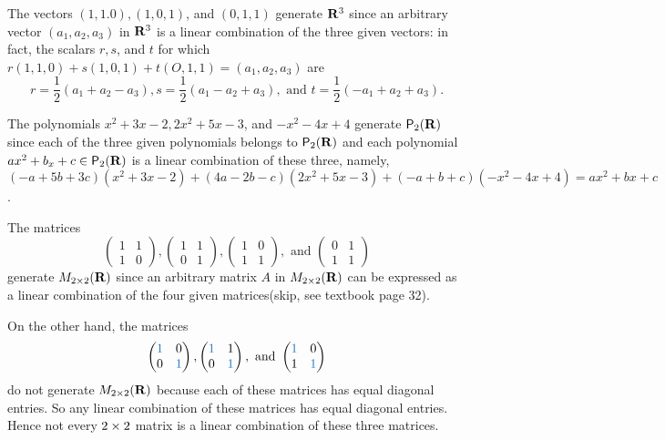 \begin{example} \label{example 1.4.3}
The vectors \((1, 1. 0), (1, 0, 1)\), and \((0, 1, 1)\) generate \(\mathbf{R}^3\) since an arbitrary vector \((a_1, a_2, a_3)\) in \(\mathbf{R}^3\) is a linear combination of the three given vectors:
in fact, the scalars \(r, s\), and \(t\) for which \(r(1, 1, 0) + s(1, 0, 1) + t(O, 1, 1) = (a_1, a_2, a_3)\)
are
\[
    r = \frac1{2}(a_1 + a_2 - a_3), s = \frac1{2}(a_1 - a_2 + a_3), \text{ and } t = \frac1{2}(-a_1 + a_2 + a_3).
\]
\end{example}

\begin{example} \label{example 1.4.4}
The polynomials \(x^2 + 3x - 2, 2x^2 + 5x - 3\), and \(-x^2 - 4x + 4\) generate \(\textsf{P}_2(\mathbf{R})\) since each of the three given polynomials belongs to \(\textsf{P}_2(\mathbf{R})\)
and each polynomial \(ax^2 + b_x + c \in \textsf{P}_2(\mathbf{R})\) is a linear combination of these three,
namely, \((-a + 5b + 3c)(x^2 + 3x - 2) + (4a - 2b - c)(2x^2 + 5x - 3) + (-a + b + c)(-x^2 - 4x + 4) = ax^2 + bx +c\). 
\end{example}

\begin{example} \label{example 1.4.5}
The matrices
\[
\begin{pmatrix}
  1 & 1 \\
  1 & 0
\end{pmatrix},
\begin{pmatrix}
  1 & 1 \\
  0 & 1
\end{pmatrix},
\begin{pmatrix}
  1 & 0 \\
  1 & 1
\end{pmatrix}, \text{ and }
\begin{pmatrix}
  0 & 1 \\
  1 & 1
\end{pmatrix}
\]
generate \(M_{2 \times 2}(\mathbf{R})\) since an arbitrary matrix \(A\) in \(M_{2 \times 2}(\mathbf{R})\) can be expressed as a linear combination of the four given matrices(skip, see textbook page 32).

On the other hand, the matrices
\[
\begin{pmatrix}
  \BLUE{1} &       0 \\
        0  & \BLUE{1}
\end{pmatrix},
\begin{pmatrix}
  \BLUE{1} &       1 \\
        0  & \BLUE{1}
\end{pmatrix}, \text{ and }
\begin{pmatrix}
  \BLUE{1} &       0 \\
        1  & \BLUE{1}
\end{pmatrix}
\]
do not generate \(M_{2 \times 2}(\mathbf{R})\) because each of these matrices has equal diagonal entries.
So any linear combination of these matrices has equal diagonal entries.
Hence not every \(2 \times 2\) matrix is a linear combination of these three matrices.
\end{example}

